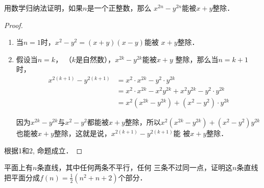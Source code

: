 \begin{example}
    用数学归纳法证明，如果$n$是一个正整数，那么
    $x^{2n}-y^{2n}$能被$x+y$整除．
\end{example}

\begin{proof}
\begin{enumerate}
    \item 当$n=1$时，$x^2-y^2=(x+y)(x-y)$能被
    $x+y$整除．
    \item 假设当$n=k$， （$k$是自然数），$x^{2k}-y^{2k}$能被$x+y$
    整除，那么当$n=k+1$时，
\[\begin{split}
    x^{2(k+1)}-y^{2(k+1)}
    &=x^2\cdot x^{2k}-y^2\cdot y^{2k}\\
    &=x^2\cdot x^{2k}-x^2y^{2k}+x^2y^{2k}-y^2\cdot y^{2k}\\
    &=x^2(x^{2k}-y^{2k})+(x^2-y^2)\cdot y^{2k}
\end{split}\]
    
    因为$x^{2k}-y^{2k}$与$x^2-y^2$都能被$x+y$整除，所以$x^2(x^{2k}-y^{2k})+(x^2-y^2)y^{2k}$也能被$x+y$整除，这就是说，$x^{2(k+1)}-y^{2(k+1)}$能
    被$x+y$整除．
\end{enumerate}  

根据1和2, 命题成立．
\end{proof}

\begin{example}
    平面上有$n$条直线，其中任何两条不平行，任何
三条不过同一点，证明这$n$条直线把平面分成$f(n)=\frac{1}{2}
(n^2+n+2)$个部分．
\end{example}


